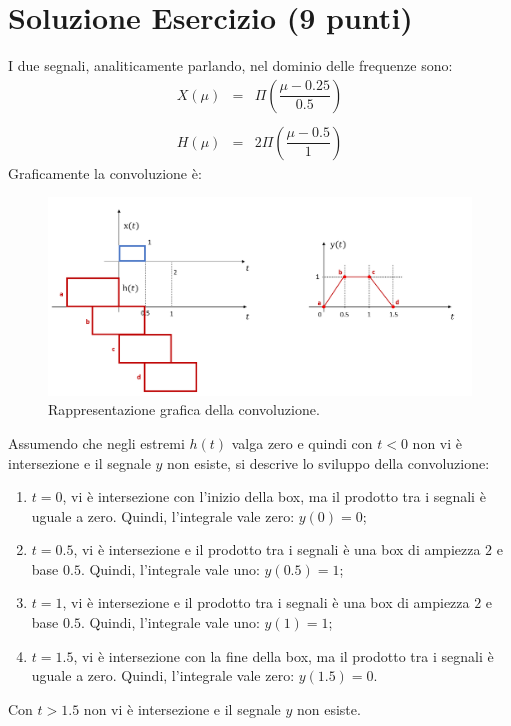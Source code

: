 \documentclass[a4paper]{article}
\begin{document}
	\section{Soluzione Esercizio (9 punti)}
	
	I due segnali, analiticamente parlando, nel dominio delle frequenze sono:
	\begin{equation*}
		\begin{array}{lll}
			X\left(\mu\right) & = & \Pi\left(\dfrac{\mu - 0.25}{0.5}\right) \\
			\\
			H\left(\mu\right) & = & 2\Pi\left(\dfrac{\mu - 0.5}{1}\right)
		\end{array}
	\end{equation*}
	Graficamente la convoluzione è:
	\begin{figure}[!htp]
		\centering
		\includegraphics[width=\textwidth]{img/fig_5.png}
		\caption*{Rappresentazione grafica della convoluzione.}
	\end{figure}
	
	\noindent
	Assumendo che negli estremi $h\left(t\right)$ valga zero e quindi con $t < 0$ non vi è intersezione e il segnale $y$ non esiste, si descrive lo sviluppo della convoluzione:
	\begin{enumerate}[label=\alph*)]
		\item $t = 0$, vi è intersezione con l'inizio della box, ma il prodotto tra i segnali è uguale a zero. Quindi, l'integrale vale zero: $y\left(0\right) = 0$;
		
		\item $t = 0.5$, vi è intersezione e il prodotto tra i segnali è una box di ampiezza $2$ e base $0.5$. Quindi, l'integrale vale uno: $y\left(0.5\right) = 1$;
		
		\item $t = 1$, vi è intersezione e il prodotto tra i segnali è una box di ampiezza $2$ e base $0.5$. Quindi, l'integrale vale uno: $y\left(1\right) = 1$;
		
		\item $t = 1.5$, vi è intersezione con la fine della box, ma il prodotto tra i segnali è uguale a zero. Quindi, l'integrale vale zero: $y\left(1.5\right) = 0$.
	\end{enumerate}
	Con $t > 1.5$ non vi è intersezione e il segnale $y$ non esiste.\newpage
	
\end{document}
